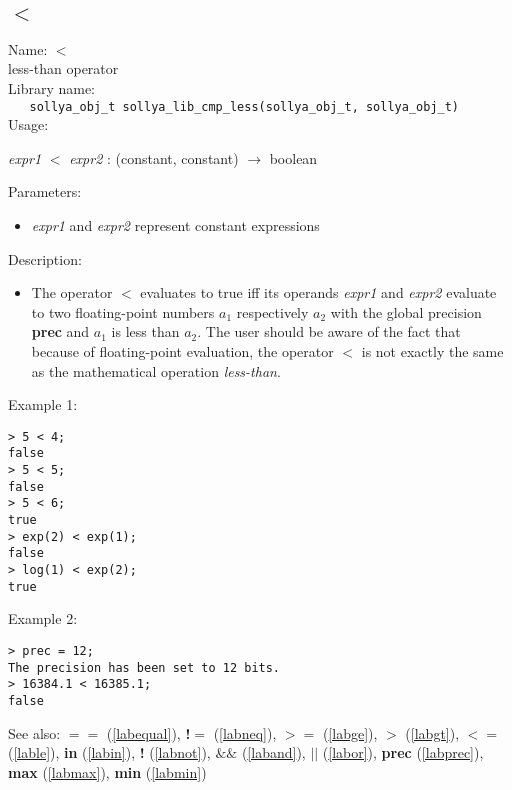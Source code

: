\subsection{$<$}
\label{lablt}
\noindent Name: \textbf{$<$}\\
\phantom{aaa}less-than operator\\[0.2cm]
\noindent Library name:\\
\verb|   sollya_obj_t sollya_lib_cmp_less(sollya_obj_t, sollya_obj_t)|\\[0.2cm]
\noindent Usage: 
\begin{center}
\emph{expr1} \textbf{$<$} \emph{expr2} : (\textsf{constant}, \textsf{constant}) $\rightarrow$ \textsf{boolean}\\
\end{center}
Parameters: 
\begin{itemize}
\item \emph{expr1} and \emph{expr2} represent constant expressions
\end{itemize}
\noindent Description: \begin{itemize}

\item The operator \textbf{$<$} evaluates to true iff its operands \emph{expr1} and
   \emph{expr2} evaluate to two floating-point numbers $a_1$
   respectively $a_2$ with the global precision \textbf{prec} and
   $a_1$ is less than $a_2$. The user should
   be aware of the fact that because of floating-point evaluation, the
   operator \textbf{$<$} is not exactly the same as the mathematical
   operation \emph{less-than}.
\end{itemize}
\noindent Example 1: 
\begin{center}\begin{minipage}{15cm}\begin{Verbatim}[frame=single]
> 5 < 4;
false
> 5 < 5;
false
> 5 < 6;
true
> exp(2) < exp(1);
false
> log(1) < exp(2);
true
\end{Verbatim}
\end{minipage}\end{center}
\noindent Example 2: 
\begin{center}\begin{minipage}{15cm}\begin{Verbatim}[frame=single]
> prec = 12;
The precision has been set to 12 bits.
> 16384.1 < 16385.1;
false
\end{Verbatim}
\end{minipage}\end{center}
See also: \textbf{$==$} (\ref{labequal}), \textbf{!$=$} (\ref{labneq}), \textbf{$>=$} (\ref{labge}), \textbf{$>$} (\ref{labgt}), \textbf{$<=$} (\ref{lable}), \textbf{in} (\ref{labin}), \textbf{!} (\ref{labnot}), \textbf{$\&\&$} (\ref{laband}), \textbf{$||$} (\ref{labor}), \textbf{prec} (\ref{labprec}), \textbf{max} (\ref{labmax}), \textbf{min} (\ref{labmin})
